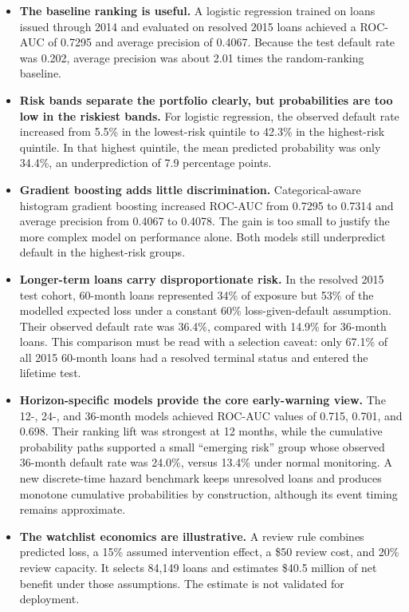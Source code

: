 \documentclass[11pt]{article}
\begin{document}
\begin{itemize}
  \item \textbf{The baseline ranking is useful.} A logistic regression trained on
  loans issued through 2014 and evaluated on resolved 2015 loans achieved a
  ROC-AUC of 0.7295 and average precision of 0.4067. Because the test default rate
  was 0.202, average precision was about 2.01 times the random-ranking baseline.

  \item \textbf{Risk bands separate the portfolio clearly, but probabilities are
  too low in the riskiest bands.} For logistic regression, the observed default
  rate increased from 5.5\% in the lowest-risk quintile to 42.3\% in the
  highest-risk quintile. In that highest quintile, the mean predicted probability
  was only 34.4\%, an underprediction of 7.9 percentage points.

  \item \textbf{Gradient boosting adds little discrimination.} Categorical-aware
  histogram gradient boosting increased ROC-AUC from 0.7295 to 0.7314 and average
  precision from 0.4067 to 0.4078. The gain is too small to justify the more
  complex model on performance alone. Both models still underpredict default in
  the highest-risk groups.

  \item \textbf{Longer-term loans carry disproportionate risk.} In the resolved
  2015 test cohort, 60-month loans represented 34\% of exposure but 53\% of the
  modelled expected loss under a constant 60\% loss-given-default assumption.
  Their observed default rate was 36.4\%, compared with 14.9\% for 36-month loans.
  This comparison must be read with a selection caveat: only 67.1\% of all 2015
  60-month loans had a resolved terminal status and entered the lifetime test.

  \item \textbf{Horizon-specific models provide the core early-warning view.}
  The 12-, 24-, and 36-month models achieved ROC-AUC values of 0.715, 0.701, and
  0.698. Their ranking lift was strongest at 12 months, while the cumulative
  probability paths supported a small ``emerging risk'' group whose observed
  36-month default rate was 24.0\%, versus 13.4\% under normal monitoring. A new
  discrete-time hazard benchmark keeps unresolved loans and produces monotone
  cumulative probabilities by construction, although its event timing remains
  approximate.

  \item \textbf{The watchlist economics are illustrative.} A review rule combines
  predicted loss, a 15\% assumed intervention effect, a \$50 review cost, and 20\%
  review capacity. It selects 84,149 loans and estimates \$40.5 million of net
  benefit under those assumptions. The estimate is not validated for deployment.
\end{itemize}
\end{document}
